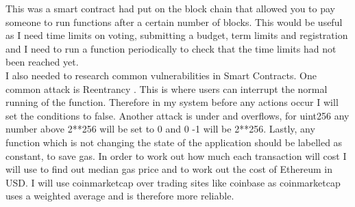 This was a smart contract \cite{Merriam:2017:pdflatex} had put on the block chain that allowed you to pay someone to run functions after a certain number of blocks. This would be useful as I need time limits on voting, submitting a budget, term limits and registration and I need to run a function periodically to check that the time limits had not been reached yet. \\
I also needed to research common vulnerabilities in Smart Contracts. One common attack is Reentrancy \citep{Grincalaitis:2017:pdflatex}. This is where users can interrupt the normal running of the function.  Therefore in my system before any actions occur I will set the conditions to false. Another attack is under and overflows, for uint256 any number above 2**256 will be set to 0 and 0 -1 will be 2**256. Lastly, any function which is not changing the state of the application should be labelled as constant, to save gas.
In order to work out how much each transaction will cost I will use \citet{ethgas:2018:pdflatex} to find out median gas price and \citet{coinmarket:2018:pdflatex} to work out the cost of Ethereum in USD. I will use coinmarketcap over trading sites like coinbase as coinmarketcap uses a weighted average and is therefore more reliable.